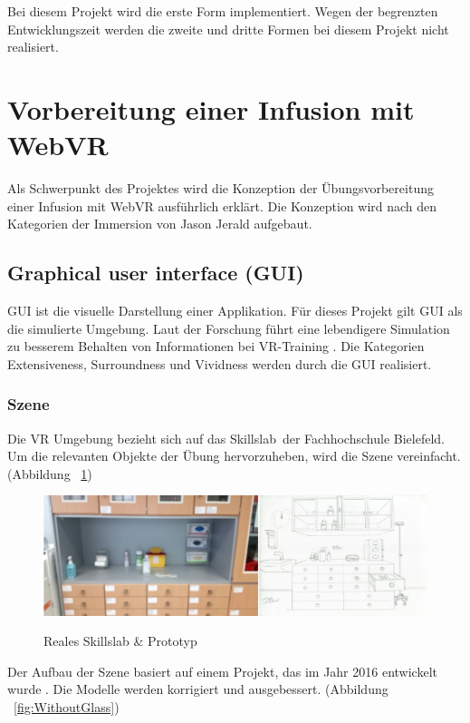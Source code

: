 Bei diesem Projekt wird die erste Form implementiert. Wegen der begrenzten Entwicklungszeit werden die zweite und dritte Formen bei diesem Projekt nicht realisiert.

\section{Vorbereitung einer Infusion mit WebVR}

Als Schwerpunkt des Projektes wird die Konzeption der Übungsvorbereitung einer Infusion mit WebVR ausführlich erklärt. Die Konzeption wird nach den Kategorien der Immersion von Jason Jerald \citep{28} aufgebaut.

 \subsection{Graphical user interface (GUI)}
 GUI ist die visuelle Darstellung einer Applikation. Für dieses Projekt gilt GUI als die simulierte Umgebung. Laut der Forschung führt eine lebendigere Simulation zu besserem Behalten von Informationen bei VR-Training \citep{27}. Die Kategorien Extensiveness, Surroundness und Vividness werden durch die GUI realisiert.
 
  \subsubsection{Szene}
  Die VR Umgebung bezieht sich auf das \glqq Skillslab\grqq\ der Fachhochschule Bielefeld. Um die relevanten Objekte der Übung hervorzuheben, wird die Szene vereinfacht. (Abbildung ~\ref{fig:realToPrototype})
  
\begin{figure}[ht]
\vspace*{1em}
\centering
\caption{Reales Skillslab \& Prototyp}
\includegraphics[width=\textwidth]{images/realToPrototype.png}
\label{fig:realToPrototype} 
\end{figure}
  
  Der Aufbau der Szene basiert auf einem Projekt, das im Jahr 2016 entwickelt wurde \citep{26}. Die Modelle werden korrigiert und ausgebessert. (Abbildung ~\ref{fig:WithoutGlass})


